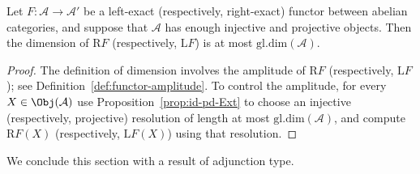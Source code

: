 \begin{corollary}
	Let $F:\mathcal{A}\to\mathcal{A}'$ be a left-exact (respectively,
	right-exact) functor between abelian categories, and suppose that
	$\mathcal{A}$ has enough injective and projective objects. Then the dimension
	of $\mathrm{R}F$ (respectively, $\mathrm{L}F$) is at most
	$\mathrm{gl.dim}(\mathcal{A})$.
\end{corollary}
\begin{proof}
	The definition of dimension involves the amplitude of $\mathrm{R}F$
	(respectively, $\mathrm{L}F$); see
	Definition~\ref{def:functor-amplitude}. To control the amplitude, for every
	$X\in\Obj(\mathcal{A})$ use Proposition~\ref{prop:id-pd-Ext} to choose an
	injective (respectively, projective) resolution of length at most
	$\mathrm{gl.dim}(\mathcal{A})$, and compute $\mathrm{R}F(X)$
	(respectively, $\mathrm{L}F(X)$) using that resolution.
\end{proof}

We conclude this section with a result of adjunction type.

